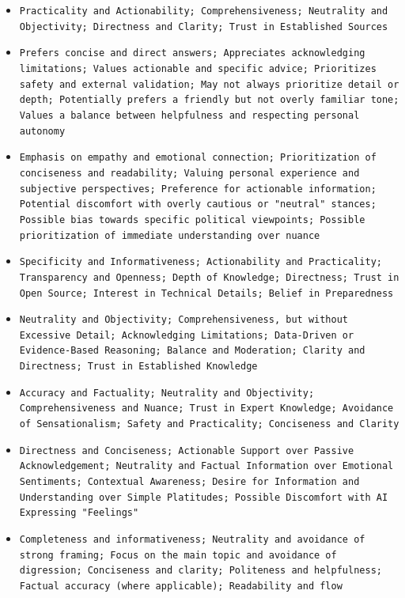 \documentclass[11pt]{article}
\begin{document}
\begin{itemize}
\item \texttt{Practicality and Actionability; Comprehensiveness; Neutrality and Objectivity; Directness and Clarity; Trust in Established Sources}
\item \texttt{Prefers concise and direct answers; Appreciates acknowledging limitations; Values actionable and specific advice; Prioritizes safety and external validation; May not always prioritize detail or depth; Potentially prefers a friendly but not overly familiar tone; Values a balance between helpfulness and respecting personal autonomy}
\item \texttt{Emphasis on empathy and emotional connection; Prioritization of conciseness and readability; Valuing personal experience and subjective perspectives; Preference for actionable information; Potential discomfort with overly cautious or "neutral" stances; Possible bias towards specific political viewpoints; Possible prioritization of immediate understanding over nuance}
\item \texttt{Specificity and Informativeness; Actionability and Practicality; Transparency and Openness; Depth of Knowledge; Directness; Trust in Open Source; Interest in Technical Details; Belief in Preparedness}
\item \texttt{Neutrality and Objectivity; Comprehensiveness, but without Excessive Detail; Acknowledging Limitations; Data-Driven or Evidence-Based Reasoning; Balance and Moderation; Clarity and Directness; Trust in Established Knowledge}
\item \texttt{Accuracy and Factuality; Neutrality and Objectivity; Comprehensiveness and Nuance; Trust in Expert Knowledge; Avoidance of Sensationalism; Safety and Practicality; Conciseness and Clarity}
\item \texttt{Directness and Conciseness; Actionable Support over Passive Acknowledgement; Neutrality and Factual Information over Emotional Sentiments; Contextual Awareness; Desire for Information and Understanding over Simple Platitudes; Possible Discomfort with AI Expressing "Feelings"}
\item \texttt{Completeness and informativeness; Neutrality and avoidance of strong framing; Focus on the main topic and avoidance of digression; Conciseness and clarity; Politeness and helpfulness; Factual accuracy (where applicable); Readability and flow}
\end{itemize}
\end{document}
